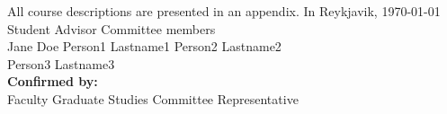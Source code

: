 \documentclass[a4paper,english]{article}
\begin{document}
\noindent All course descriptions are presented in an appendix.
\newpage
\noindent In Reykjavik, \today\\[3cm]
\noindent Student \hspace*{\fill} Advisor \hspace*{\fill} Committee members\\
\noindent Jane Doe \hspace*{\fill} Person1 Lastname1 \hspace*{\fill} Person2 Lastname2\\
\hspace*{\fill} Person3 Lastname3\\[1cm]
\noindent \textbf{Confirmed by:}\\[3cm]
Faculty Graduate Studies Committee Representative
\end{document}
